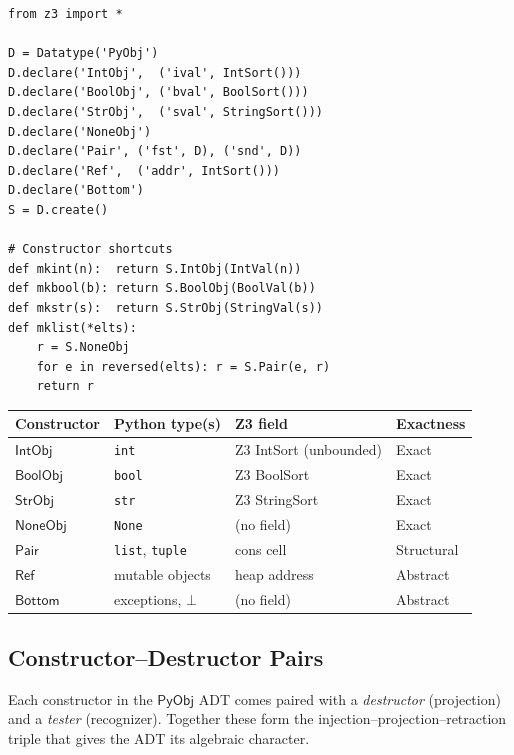 \documentclass[11pt,a4paper]{report}
\theoremstyle{definition}
\theoremstyle{plain}
\newcommand{\PyObj}{\mathsf{PyObj}}
\begin{document}
\begin{lstlisting}[caption={PyObj ADT: complete Z3 implementation}]
from z3 import *

D = Datatype('PyObj')
D.declare('IntObj',  ('ival', IntSort()))
D.declare('BoolObj', ('bval', BoolSort()))
D.declare('StrObj',  ('sval', StringSort()))
D.declare('NoneObj')
D.declare('Pair', ('fst', D), ('snd', D))
D.declare('Ref',  ('addr', IntSort()))
D.declare('Bottom')
S = D.create()

# Constructor shortcuts
def mkint(n):  return S.IntObj(IntVal(n))
def mkbool(b): return S.BoolObj(BoolVal(b))
def mkstr(s):  return S.StrObj(StringVal(s))
def mklist(*elts):
    r = S.NoneObj
    for e in reversed(elts): r = S.Pair(e, r)
    return r
\end{lstlisting}

\begin{center}
\begin{tabular}{l l l l}
  \textbf{Constructor} & \textbf{Python type(s)} & \textbf{Z3 field} &
  \textbf{Exactness} \\
  \hline
  $\mathsf{IntObj}$ & \texttt{int} & Z3 IntSort (unbounded) & Exact \\
  $\mathsf{BoolObj}$ & \texttt{bool} & Z3 BoolSort & Exact \\
  $\mathsf{StrObj}$ & \texttt{str} & Z3 StringSort & Exact \\
  $\mathsf{NoneObj}$ & \texttt{None} & (no field) & Exact \\
  $\mathsf{Pair}$ & \texttt{list}, \texttt{tuple} & cons cell & Structural \\
  $\mathsf{Ref}$ & mutable objects & heap address & Abstract \\
  $\mathsf{Bottom}$ & exceptions, $\bot$ & (no field) & Abstract \\
\end{tabular}
\end{center}

\subsection{Constructor--Destructor Pairs}

Each constructor in the $\PyObj$ ADT comes paired with a
\emph{destructor} (projection) and a \emph{tester} (recognizer).
Together these form the injection--projection--retraction triple
that gives the ADT its algebraic character.
\end{document}
